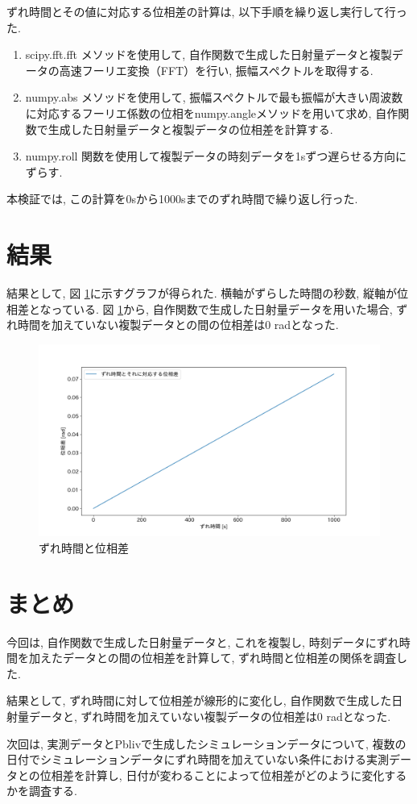 \documentclass[a4j,12pt,]{jarticle}
\begin{document}
ずれ時間とその値に対応する位相差の計算は, 以下手順を繰り返し実行して行った.

\begin{enumerate}
  \item scipy.fft.fft メソッドを使用して, 自作関数で生成した日射量データと複製データの高速フーリエ変換（FFT）を行い, 振幅スペクトルを取得する.  
  \item numpy.abs メソッドを使用して, 振幅スペクトルで最も振幅が大きい周波数に対応するフーリエ係数の位相をnumpy.angleメソッドを用いて求め, 自作関数で生成した日射量データと複製データの位相差を計算する. 
  \item numpy.roll 関数を使用して複製データの時刻データを1sずつ遅らせる方向にずらす. 
\end{enumerate}

本検証では, この計算を0sから1000sまでのずれ時間で繰り返し行った. 

\section{結果}
結果として, 図 \ref{p2}に示すグラフが得られた. 横軸がずらした時間の秒数, 縦軸が位相差となっている. 図 \ref{p2}から, 自作関数で生成した日射量データを用いた場合, ずれ時間を加えていない複製データとの間の位相差は0 \si{\radian}となった.

\begin{figure}[H]
  \begin{center}
    \includegraphics[width=160mm]{phase_difference.png}
    \caption{ずれ時間と位相差}
    \label{p2}
  \end{center}
\end{figure}

\section{まとめ}
今回は, 自作関数で生成した日射量データと, これを複製し, 時刻データにずれ時間を加えたデータとの間の位相差を計算して, ずれ時間と位相差の関係を調査した.

結果として, ずれ時間に対して位相差が線形的に変化し, 自作関数で生成した日射量データと, ずれ時間を加えていない複製データの位相差は0 \si{\radian}となった.

次回は, 実測データとPblivで生成したシミュレーションデータについて, 複数の日付でシミュレーションデータにずれ時間を加えていない条件における実測データとの位相差を計算し, 日付が変わることによって位相差がどのように変化するかを調査する.
\end{document}
